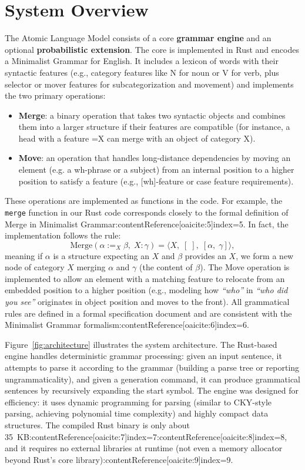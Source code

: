 \documentclass[11pt]{article}
\begin{document}
\section{System Overview}
The Atomic Language Model consists of a core \textbf{grammar engine} and an optional \textbf{probabilistic extension}. The core is implemented in Rust and encodes a Minimalist Grammar for English. It includes a lexicon of words with their syntactic features (e.g., category features like N for noun or V for verb, plus selector or mover features for subcategorization and movement) and implements the two primary operations:
\begin{itemize}\itemsep0em 
    \item \textbf{Merge}: a binary operation that takes two syntactic objects and combines them into a larger structure if their features are compatible (for instance, a head with a feature =X can merge with an object of category X).
    \item \textbf{Move}: an operation that handles long-distance dependencies by moving an element (e.g. a wh-phrase or a subject) from an internal position to a higher position to satisfy a feature (e.g., [wh]-feature or case feature requirements).
\end{itemize}
These operations are implemented as functions in the code. For example, the \texttt{merge} function in our Rust code corresponds closely to the formal definition of Merge in Minimalist Grammar:contentReference[oaicite:5]{index=5}. In fact, the implementation follows the rule:
\[ \text{Merge}(\alpha :=_X \beta,\; X:\gamma) = \langle X,\; [\;],\; [\alpha,\; \gamma]\rangle, \] 
meaning if $\alpha$ is a structure expecting an $X$ and $\beta$ provides an $X$, we form a new node of category $X$ merging $\alpha$ and $\gamma$ (the content of $\beta$). The Move operation is implemented to allow an element with a matching feature to relocate from an embedded position to a higher position (e.g., modeling how \emph{``who''} in \emph{``who did you see''} originates in object position and moves to the front). All grammatical rules are defined in a formal specification document and are consistent with the Minimalist Grammar formalism:contentReference[oaicite:6]{index=6}.

Figure~\ref{fig:architecture} illustrates the system architecture. The Rust-based engine handles deterministic grammar processing: given an input sentence, it attempts to parse it according to the grammar (building a parse tree or reporting ungrammaticality), and given a generation command, it can produce grammatical sentences by recursively expanding the start symbol. The engine was designed for efficiency: it uses dynamic programming for parsing (similar to CKY-style parsing, achieving polynomial time complexity) and highly compact data structures. The compiled Rust binary is only about 35~KB:contentReference[oaicite:7]{index=7}:contentReference[oaicite:8]{index=8}, and it requires no external libraries at runtime (not even a memory allocator beyond Rust's core library):contentReference[oaicite:9]{index=9}.
\end{document}
